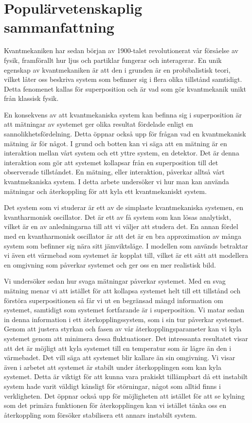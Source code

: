 \section*{Populärvetenskaplig sammanfattning}
Kvantmekaniken har sedan början av 1900-talet revolutionerat vår försåelse av fysik, framförallt hur ljus och partiklar fungerar och interagerar. En unik egenskap av kvantmekaniken är att den i grunden är en probibalistisk teori, vilket låter oss beskriva system som befinner sig i flera olika tillstånd samtidigt. Detta fenomenet kallas för superposition och är vad som gör kvantmekanik unikt från klassisk fysik. 

En konsekvens av att kvantmekaniska system kan befinna sig i superposition är att mätningar av systemet ger olika resultat fördelade enligt en sannolikhetsfördelning. Detta öppnar också upp för frågan vad en kvantmekanisk mätning är för något. I grund och botten kan vi säga att en mätning är en interaktion mellan vårt system och ett yttre system, en detektor. Det är denna interaktion som gör att systemet kollapsar från en superposition till det observerade tillståndet. En mätning, eller interaktion, påverkar alltså vårt kvantmekaniska system. I detta arbete undersöker vi hur man kan använda mätningar och återkoppling för att kyla ett kvantmekaniskt system.

Det system som vi studerar är ett av de simplaste kvantmekaniska systemen, en kvantharmonisk oscillator. Det är ett av få system som kan lösas analytiskt, vilket är en av anledningarna till att vi väljer att studera det. En annan fördel med en kvantharmonisk oscillator är att det är en bra approximation av många system som befinner sig nära sitt jämviktsläge. I modellen som används betraktar vi även ett värmebad som systemet är kopplat till, vilket är ett sätt att modellera en omgivning som påverkar systemet och ger oss en mer realistisk bild.

Vi undersöker sedan hur svaga mätningar påverkar systemet. Med en svag mätning menar vi att istället för att kollapsa systemet helt till ett tillstånd och förstöra superpositionen så får vi ut en begränsad mängd information om systemet, samtidigt som systemet fortfarande är i superposition. Vi matar sedan in denna information i ett återkopplingssystem, som i sin tur påverkar systemet. Genom att justera styrkan och fasen av vår återkopplingsparameter kan vi kyla systemet genom att minimera dessa fluktuationer. Det intressanta resultatet visar att det är möjligt att kyla systemet till en temperatur som är lägre än den i värmebadet. Det vill säga att systemet blir kallare än sin omgivning. Vi visar även i arbetet att systemet är stabilt under återkopplingen som kan kyla systemet. Detta är viktigt för att kunna vara prakiskt tillämpbart då ett instabilt system hade varit väldigt känsligt för störningar, något som alltid finns i verkligheten. Det öppnar också upp för möjligheten att istället för att se kylning som det primära funktionen för återkopplingen kan vi istället tänka oss en återkoppling som försöker stabilisera ett annars instabilt system.

